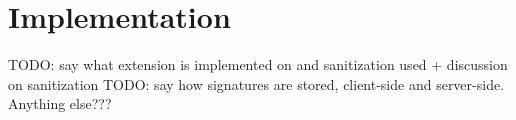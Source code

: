 \section{Implementation}

TODO: say what extension is implemented on and sanitization used + discussion on sanitization
TODO: say how signatures are stored, client-side and server-side.
Anything else???